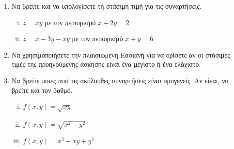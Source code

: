 \begin{enumerate}
\item Να βρείτε και να υπολογίσετε τη στάσιμη τιμή για τις συναρτήσεις.

\begin{enumerate}[i)]
\item $z=xy$ με τον περιορισμό $x+2y=2$
\item $z=x-3y-xy$ με τον περιορισμό $x+y=6$
\end{enumerate}


\item Να χρησιμοποιήσετε την πλαισιωμένη Εσσιανή για να ορίσετε αν οι στάσιμες τιμές της προηγούμενης άσκησης είναι ένα μέγιστο ή ένα ελάχιστο.


\item Να βρείτε ποιες από τις ακόλουθες συναρτήσεις είναι ομογενείς. Αν είναι, να βρείτε και τον βαθμό.

\begin{enumerate}[i)]
\item $f(x,y)=\sqrt{xy}$
\item $f(x,y)=\sqrt{x^2-y^2}$
\item $f(x,y)=x^3-xy+y^3$
\end{enumerate}

\end{enumerate}

